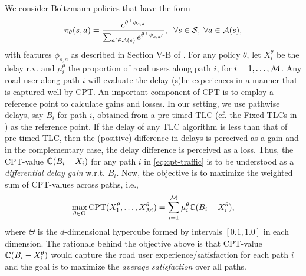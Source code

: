 We consider Boltzmann policies that have the form
$$
\pi_{\theta}(s,a) = \frac{e^{\theta^{\top} \phi_{s,a}}}{\sum_{a' \in {\mathcal{A}(s)}} e^{\theta^{\top} \phi_{s,a'}}},
\hspace{6pt} \forall s \in \mathcal{S},\;\forall a \in \mathcal{A}(s),
$$
with features $\phi_{s,a}$ as described in Section V-B of \cite{prashanth2012threshold}.
For any policy $\theta$, let $X_i^\theta$ be the delay r.v. and $\mu_i^\theta$ the proportion of road users along path $i$, for $i=1,\ldots,\mathcal{M}$. 
Any road user along path $i$ will evaluate the delay (s)he experiences in a manner that is captured well by CPT. 
An important component of CPT is to employ a reference point to calculate gains and losses. 
In our setting, we use pathwise delays, say $B_i$ for path $i$, obtained from a pre-timed TLC (cf. the Fixed TLCs in \cite{prashanth2011reinforcement}) as the reference point.
If the delay of any TLC algorithm is less than that of pre-timed TLC, then the (positive) difference in delays is perceived as a gain and in the complementary case, the delay difference is perceived as a loss. Thus, the CPT-value $\mathbb{C}(B_i-X_i)$ for any path $i$ in \eqref{eq:cpt-traffic} is to be understood as a \textit{differential delay gain} w.r.t. $B_i$.  
Now, the objective is to maximize the weighted sum of CPT-values across paths, i.e., 
\begin{align}
\max_{\theta \in \Theta} \text{CPT}(X_1^\theta,\ldots,X_{\mathcal{M}}^\theta) = \sum_{i=1}^{\mathcal{M}} \mu_i^\theta \mathbb{C}(B_i - X_i^\theta),\label{eq:cpt-traffic}
\end{align}
where $\Theta$ is the $d$-dimensional hypercube formed by intervals $[0.1,1.0]$ in each dimension. The rationale behind the objective above is that CPT-value $\mathbb{C}(B_i - X_i^\theta)$ would capture the road user experience/satisfaction for each path $i$ and the goal is to maximize the \textit{average satisfaction} over all paths.  

